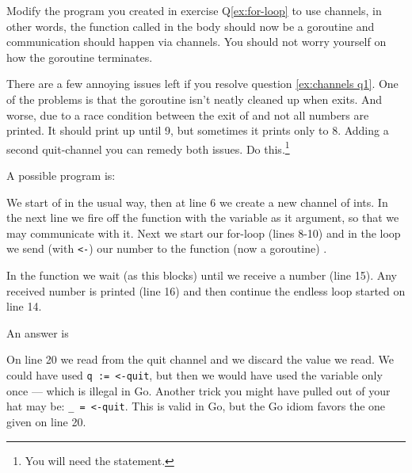\begin{Exercise}[title={Channels},difficulty=1]
\label{ex:channels}
\Question\label{ex:channels q1} Modify the program you created in
exercise Q\ref{ex:for-loop}
to use channels, in other words, the function called in the body
should now be a goroutine and communication should happen via
channels. You should not worry yourself on how the goroutine
terminates.

\Question\label{ex:channels q2} There are a few annoying issues left if
you resolve question \ref{ex:channels q1}. One of the problems is
that the goroutine isn't neatly cleaned up when 
exits. And worse, due to a race condition between the exit of 
 and  not all numbers are printed.
It should print up until 9, but sometimes it prints only to 8. Adding
a second quit-channel you can remedy both issues. Do this.\footnote{You
will need the  statement.}

\end{Exercise}

\begin{Answer}
\Question A possible program is: 

We start of in the usual way, then at line 6 we create a new channel of
ints. In the next line we fire off the function  with
the  variable as it argument, so that we may communicate with
it. Next we start our for-loop (lines 8-10) and in the loop
we send (with \lstinline{<-}) our number to the function (now a goroutine) .

In the function  we wait (as this blocks) until we receive a number (line
15). Any received number is printed (line 16) and then continue the endless loop
started on line 14.

\Question An answer is

On line 20 we read from the quit channel and we discard the value we
read. We could have used \lstinline{q := <-quit}, but then we would have used
the variable only once --- which is illegal in Go. Another trick you
might have pulled out of your hat may be: \lstinline{_ = <-quit}. This is
valid in Go, but the Go idiom favors the one given on line 20.
\end{Answer}
